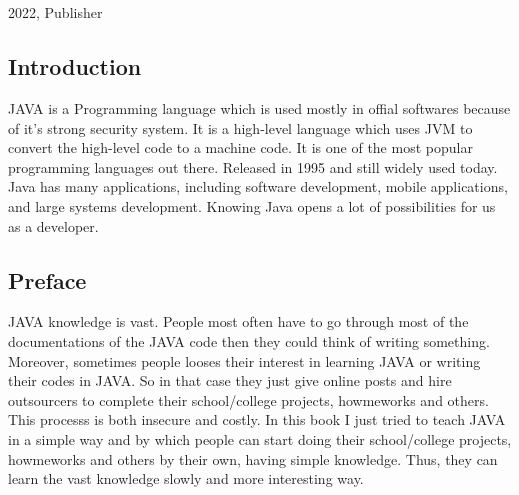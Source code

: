 \documentclass[openany]{book}  %
\begin{document}
\begin{titlepage}
{\begin{verbatim}
                                                                                                      
                                                                                                      
        \end{verbatim}
    }
    \vfill
    {\small{2022, Publisher}}
\end{titlepage}


\pagecolor{smokeWhite}
\color{black}
\newpage
\tableofcontents
\newpage
\listoffigures
\newpage
\listoftables
\newpage
\begin{flushleft}


    \part{Introduction}
    JAVA\cite{Ref1} is a Programming language which is used mostly in offial softwares because of it's strong security system.
    It is a high-level language which uses JVM to convert the high-level code to a machine code.
    It is one of the most popular programming languages out there. Released in 1995 and still widely used today.
    Java has many applications, including software development, mobile applications, and large systems development.
    Knowing Java opens a lot of possibilities for us as a developer.

    \chapter*{Preface}
    JAVA\cite{Ref1} knowledge is vast. People most often have to go through most of the documentations of the JAVA code then they could think of writing something.
    Moreover, sometimes people looses their interest in learning JAVA or writing their codes in JAVA. So in that case they just give online posts
    and hire outsourcers to complete their school/college projects, howmeworks and others.
    This processs is both insecure and costly. In this book I just tried to teach JAVA in a simple way and by which
    people can start doing their school/college projects, howmeworks and others by their own, having simple knowledge. Thus, they can learn the vast knowledge slowly and more interesting way.


\end{flushleft}
\end{document}
